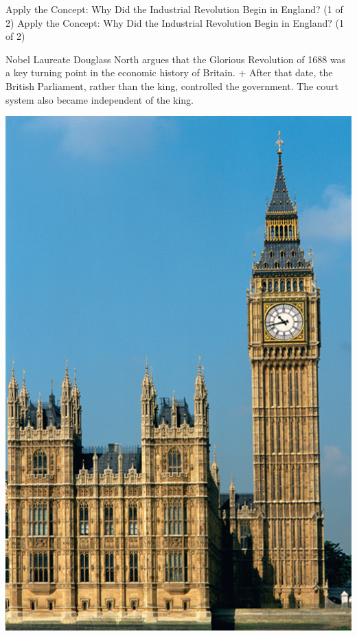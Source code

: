 \documentclass[
  12pt,
  ignorenonframetext,
]{beamer}
\begin{document}
\begin{frame}{Apply the Concept: Why Did the Industrial Revolution Begin
in England? (1 of 2)}
\protect\hypertarget{apply-the-concept-why-did-the-industrial-revolution-begin-in-england-1-of-2}{}
Apply the Concept: Why Did the Industrial Revolution Begin in England?
(1 of 2)

Nobel Laureate Douglass North argues that the Glorious Revolution of
1688 was a key turning point in the economic history of Britain. + After
that date, the British Parliament, rather than the king, controlled the
government. The court system also became independent of the king.

\includegraphics[width=\textwidth,height=0.99\textheight]{imgs3/img_slide09a.png}
\end{frame}
\end{document}
